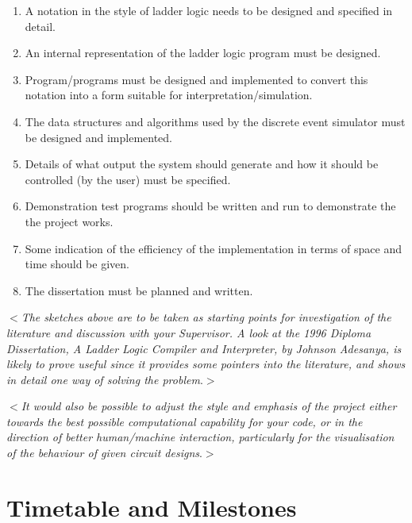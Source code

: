 \documentclass[12pt]{article}
\newcommand{\al}{$<$}
\newcommand{\ar}{$>$}
\begin{document}
\begin{enumerate}

\item A notation in the style of ladder logic needs to be designed and
  specified in detail.

\item An internal representation of the ladder logic program must be
  designed.

\item Program/programs must be designed and implemented to convert
  this notation into a form suitable for interpretation/simulation.

\item The data structures and algorithms used by the discrete event simulator
must be designed and implemented.

\item Details of what output the system should generate and how it
  should be controlled (by the user) must be specified.

\item Demonstration test programs should be written and run to
  demonstrate the the project works.

\item Some indication of the efficiency of the implementation in terms
  of space and time should be given.

\item The dissertation must be planned and written.

\end{enumerate}

\al\emph{The sketches above are to be taken as starting points for
  investigation of the literature and discussion with your Supervisor.
  A look at the 1996 Diploma Dissertation, {\rm A Ladder Logic
    Compiler and Interpreter}, by Johnson Adesanya, is likely to prove
  useful since it provides some pointers into the literature, and
  shows in detail one way of solving the problem}.\ar

\medskip \al\emph{It would also be possible to adjust the style and
  emphasis of the project either towards the best possible
  computational capability for your code, or in the direction of
  better human/machine interaction, particularly for the visualisation
  of the behaviour of given circuit designs}.\ar



\section*{Timetable and Milestones}
\end{document}
